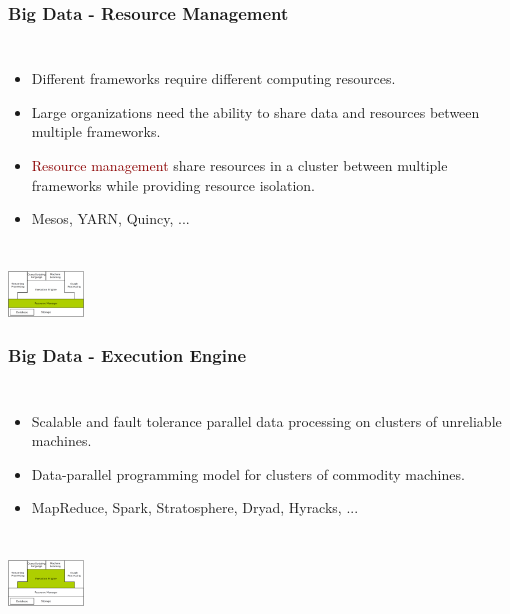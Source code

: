 \documentclass{beamer}
\begin{document}
\begin{frame}
\frametitle{Big Data - Resource Management}
\begin{columns}
\column{30em}
\begin{itemize}\itemsep1em
  \justifying
  \item Different frameworks require different \textcolor{Ocean}{computing resources}.
  \item Large organizations need the ability to \textcolor{Ocean}{share data and resources} between multiple frameworks. 
  \item \textcolor{darkred}{Resource management} share resources in a cluster between \textcolor{Ocean}{multiple frameworks} while providing resource \textcolor{TextGreen}{isolation}.
  \item Mesos, YARN, Quincy, ...
\end{itemize}
\end{columns}
\vspace{1.8cm}
\hspace*{10cm}\includegraphics[width=2cm]{figs/stack_job.pdf}
\end{frame}

\begin{frame}
\frametitle{Big Data - Execution Engine}
\begin{columns}
\column{30em}
\begin{itemize}\itemsep1em
  \justifying
  \item \textcolor{Ocean}{Scalable} and \textcolor{Ocean}{fault tolerance} parallel data processing on clusters of unreliable machines.
  \item Data-parallel \textcolor{Ocean}{programming model} for clusters of commodity machines.
  \item MapReduce, Spark, Stratosphere, Dryad, Hyracks, ...
\end{itemize}
\end{columns}
\vspace{2.55cm}
\hspace*{10cm}\includegraphics[width=2cm]{figs/stack_execution.pdf}
\end{frame}
\end{document}
